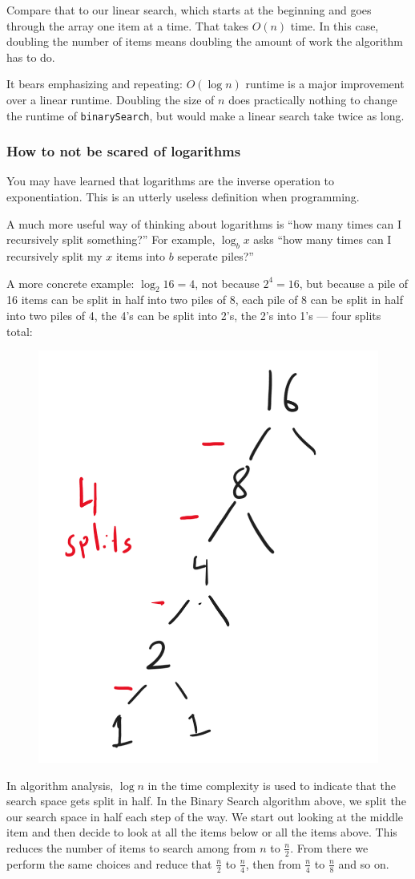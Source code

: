 Compare that to our linear search, which starts at the beginning and goes through the array one item at a time. That takes $O(n)$ time. In this case, doubling the number of items means doubling the amount of work the algorithm has to do.

It bears emphasizing and repeating:  $O(\log n)$ runtime is a major improvement over a linear runtime.  Doubling the size of $n$ does practically nothing to change the runtime of \texttt{binarySearch}, but would make a linear search take twice as long.


\subsubsection{How to not be scared of logarithms}
You may have learned that logarithms are the inverse operation to exponentiation.
This is an utterly useless definition when programming.

A much more useful way of thinking about logarithms is ``how many times can I recursively split something?''
For example, $\log_b x$ asks ``how many times can I recursively split my $x$ items into $b$ seperate piles?''

A more concrete example: $\log_2 16 = 4$, not because $2^4 = 16$, but because a pile of 16 items can be split in half into two piles of 8, each pile of 8 can be split in half into two piles of 4, the 4's can be split into 2's, the 2's into 1's --- four splits total:

\begin{figure}[h!]
	\centering
	\includegraphics[width=0.4\linewidth]{pics/log16}
	\caption{}
	\label{fig:log16}
\end{figure}



In algorithm analysis, $\log n$ in the time complexity is used to indicate that the search space gets split in half.
In the Binary Search algorithm above, we split the our search space in half each step of the way.  We start out looking at the middle item and then decide to look at all the items below or all the items above.  This reduces the number of items to search among from $n$ to $\frac{n}{2}$.  From there we perform the same choices and reduce that $\frac{n}{2}$ to $\frac{n}{4}$, then from  $\frac{n}{4}$ to  $\frac{n}{8}$ and so on.

